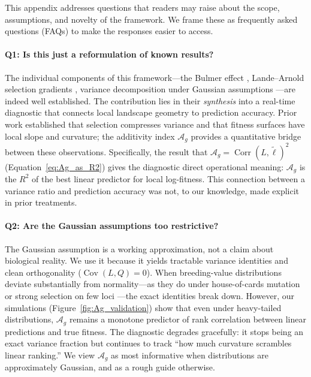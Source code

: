 \documentclass[9pt,twocolumn,twoside,lineno]{gsajnl}
\newcommand{\Ag}{\ensuremath{\mathcal{A}_{g}}\xspace}
\newcommand{\Cov}{\ensuremath{\operatorname{Cov}}\xspace}
\newcommand{\Corr}{\ensuremath{\operatorname{Corr}}\xspace}
\begin{document}

This appendix addresses questions that readers may raise about the scope, assumptions, and novelty of the framework. We frame these as frequently asked questions (FAQs) to make the responses easier to access.

\paragraph{Q1: Is this just a reformulation of known results?}

The individual components of this framework---the Bulmer effect \citep{Bulmer1971}, Lande--Arnold selection gradients \citep{LandeArnold1983}, variance decomposition under Gaussian assumptions \citep{Mardia1979}---are indeed well established. The contribution lies in their \emph{synthesis} into a real-time diagnostic that connects local landscape geometry to prediction accuracy. Prior work established that selection compresses variance and that fitness surfaces have local slope and curvature; the additivity index \Ag provides a quantitative bridge between these observations. Specifically, the result that $\Ag = \Corr(L, \tilde{\ell})^2$ (Equation~\ref{eq:Ag_as_R2}) gives the diagnostic direct operational meaning: \Ag is the $R^2$ of the best linear predictor for local log-fitness. This connection between a variance ratio and prediction accuracy was not, to our knowledge, made explicit in prior treatments.

\paragraph{Q2: Are the Gaussian assumptions too restrictive?}

The Gaussian assumption is a working approximation, not a claim about biological reality. We use it because it yields tractable variance identities and clean orthogonality ($\Cov(L,Q) = 0$). When breeding-value distributions deviate substantially from normality---as they do under house-of-cards mutation or strong selection on few loci \citep{Turelli1984, TurelliBarton1994}---the exact identities break down. However, our simulations (Figure~\ref{fig:Ag_validation}) show that even under heavy-tailed distributions, \Ag remains a monotone predictor of rank correlation between linear predictions and true fitness. The diagnostic degrades gracefully: it stops being an exact variance fraction but continues to track ``how much curvature scrambles linear ranking.'' We view \Ag as most informative when distributions are approximately Gaussian, and as a rough guide otherwise.
\end{document}
